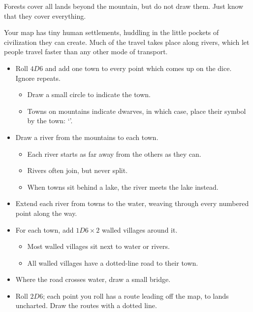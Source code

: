 \begin{multicols}{2}
Forests cover all lands beyond the mountain, but do not draw them. Just
know that they cover everything.


Your map has tiny human settlements, huddling in the little pockets of civilization they can create.
Much of the travel takes place along rivers, which let people travel faster than any other mode of transport.

\begin{itemize}
\item
  Roll $4D6$ and add one town to every point which comes up on the dice.
  Ignore repeats.

  \begin{itemize}
  \item
    Draw a small circle to indicate the town.
  \item
    Towns on mountains indicate dwarves, in which case, place their symbol by the town: `\Dw'.
  \end{itemize}
\item
  Draw a river from the mountains to each town.

  \begin{itemize}
  \item
    Each river starts as far away from the others as they can.
  \item
    Rivers often join, but never split.
  \item
    When towns sit behind a lake, the river meets the lake instead.
  \end{itemize}
\item
  Extend each river from towns to the water, weaving through every numbered point along the way.
\item
  For each town, add $1D6 \times 2$ walled villages around it.
  \begin{itemize}
  \item
    Most walled villages sit next to water or rivers.
  \item
    All walled villages have a dotted-line road to their town.
  \end{itemize}
\item
  Where the road crosses water, draw a small bridge.
\item
  Roll $2D6$; each point you roll has a route leading off the map, to lands uncharted.
  Draw the routes with a dotted line.
\end{itemize}



\end{multicols}
